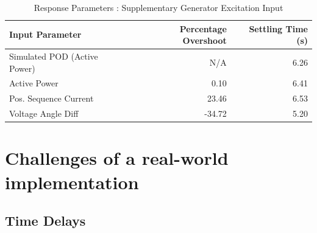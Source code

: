 \documentclass[journal]{IEEEtran}
\begin{document}
\begin{table}[!ht]
\caption{Response Parameters : Supplementary Generator Excitation Input}\label{GENResponseTable}
\begin{center}
\begin{tabular}{|l|r|r|}
\hline \textbf{Input Parameter} & \textbf{Percentage Overshoot} & \textbf{Settling Time (s)} \\
\hline Simulated POD (Active Power) & N/A & 6.26\\ 
\hline Active Power & 0.10 & 6.41\\ 
\hline Pos. Sequence Current & 23.46 & 6.53 \\ 
\hline Voltage Angle Diff & -34.72 & 5.20 \\ 
\hline 
\end{tabular}
\end{center}
\end{table}  
\vspace{-2em}


\section{Challenges of a real-world implementation}\label{Challenges}

\subsection{Time Delays}
\end{document}
